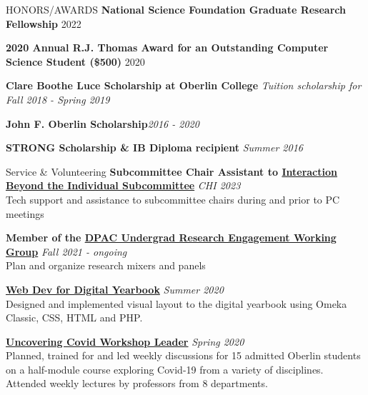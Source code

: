 \documentclass{resume}
\begin{document}
\begin{rSection}{HONORS/AWARDS}
{\bf National Science Foundation Graduate Research Fellowship} \hfill{2022} 

{\bf 2020 Annual R.J. Thomas Award for an Outstanding Computer Science Student (\$500)} \hfill{2020} 

{\bf Clare Boothe Luce Scholarship at Oberlin College} \hfill{\em Tuition scholarship for Fall 2018 - Spring 2019} 

{\bf John F. Oberlin Scholarship}\hfill{\em 2016 - 2020} 

{\bf STRONG Scholarship \& IB Diploma recipient }\hfill{\em Summer 2016}

\end{rSection}

\begin{rSection}{Service \& Volunteering} 
{\bf Subcommittee Chair Assistant to \href{https://chi2023.acm.org/subcommittees/selecting-a-subcommittee/}{Interaction Beyond the Individual Subcommittee}} \hfill{\em CHI 2023} \\
Tech support and assistance to subcommittee chairs during and prior to PC meetings 

{\bf Member of the \href{https://scs-phd-deans-committee.github.io/working-groups}{DPAC Undergrad Research Engagement Working Group}} \hfill{\em Fall 2021 - ongoing} \\
Plan and organize research mixers and panels

{\bf \href{https://www.oc2020.oberlincollegelibrary.org/}{Web Dev for Digital Yearbook}} \hfill{\em Summer 2020} \\
Designed and implemented visual layout to the digital yearbook using Omeka Classic, CSS, HTML and PHP.

{\bf \href{https://www.oberlin.edu/admissions-and-aid/for-accepted-students/virtual-visits/covid-19-course}{Uncovering Covid Workshop Leader}} \hfill{\em Spring 2020} \\
Planned, trained for and led weekly discussions for 15 admitted Oberlin students on a half-module course exploring Covid-19 from a variety of disciplines. Attended weekly lectures by professors from 8 departments.



\end{rSection}
\end{document}
